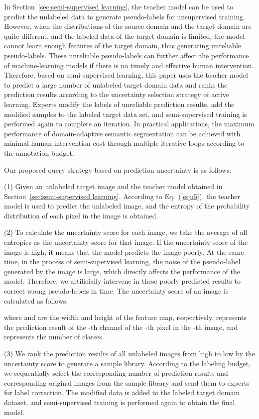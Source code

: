 \documentclass[journal]{IEEEtran}
\newcommand{\Sref}[1]{Section~\ref{#1}}
\newcommand{\eref}[1]{Eq.~(\ref{#1})}
\begin{document}
In \Sref{sec:semi-supervised learning}, the teacher model can be used to predict the unlabeled data to generate pseudo-labels for unsupervised training. However, when the distributions of the source domain and the target domain are quite different, and the labeled data of the target domain is limited, the model cannot learn enough features of the target domain, thus generating unreliable pseudo-labels. These unreliable pseudo-labels can further affect the performance of machine-learning models if there is no timely and effective human intervention. Therefore, based on semi-supervised learning, this paper uses the teacher model to predict a large number of unlabeled target domain data and ranks the prediction results according to the uncertainty selection strategy of active learning. Experts modify the labels of unreliable prediction results, add the modified samples to the labeled target data set, and semi-supervised training is performed again to complete an iteration. In practical applications, the maximum performance of domain-adaptive semantic segmentation can be achieved with minimal human intervention cost through multiple iterative loops according to the annotation budget.

Our proposed query strategy based on prediction uncertainty is as follows: 

(1) Given an unlabeled target image  and the teacher model  obtained in \Sref{sec:semi-supervised learning}. According to \eref{equ5}, the teacher model is used to predict the unlabeled image, and the entropy of the probability distribution of each pixel in the image is obtained. 

(2) To calculate the uncertainty score for each image, we take the average of all entropies as the uncertainty score for that image. If the uncertainty score of the image is high, it means that the model predicts the image poorly. At the same time, in the process of semi-supervised learning, the noise of the pseudo-label generated by the image is large, which directly affects the performance of the model. Therefore, we artificially intervene in these poorly predicted results to correct wrong pseudo-labels in time. The uncertainty score of an image is calculated as follows:

where  and  are the width and height of the feature map, respectively,  represents the prediction result of the -th channel of the -th pixel in the -th image, and  represents the number of classes.

(3) We rank the prediction results of all unlabeled images from high to low by the uncertainty score to generate a sample library. According to the labeling budget, we sequentially select the corresponding number of prediction results and corresponding original images from the sample library and send them to experts for label correction. The modified data is added to the labeled target domain dataset, and semi-supervised training is performed again to obtain the final model.
\end{document}
